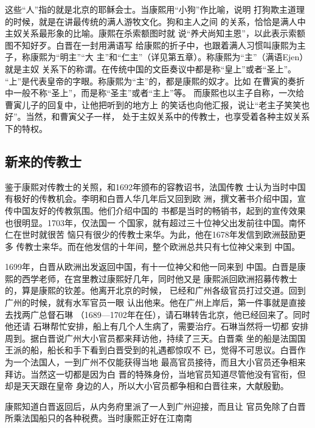 \par
这些“人”指的就是北京的耶稣会士。当康熙用“小狗”作比喻，说明%
打狗欺主道理的时候，就是在讲最传统的满人游牧文化。狗和主人之间%
的关系，恰恰是满人中主奴关系最形象的比喻。康熙在杀索额图时就%
说“养犬尚知主恩”，以此表示索额图不知好歹。白晋在一封用满语写%
给康熙的折子中，也跟着满人习惯叫康熙为主子，称康熙为“明主”“大%
主”和“仁主”（详见第五章）。称康熙为“主”（满语Ejen）就是主奴%
关系下的称谓。在传统中国的文臣奏议中都是称“皇上”或者“圣上”。%
“上”是代表皇帝的字眼。称康熙为“主”的，都是康熙的奴才。比如%
在曹寅的奏折中一般不称“圣上”，而是称“圣主”或者“主上”等。%
而康熙也以主子自称，一次给曹寅儿子的回复中，让他把听到的地方上%
的笑话也向他汇报，说让“老主子笑笑也好”。当然，和曹寅父子一样，%
处于主奴关系中的传教士，也享受着各种主奴关系下的特权。%
\subsection{新来的传教士}
\par
鉴于康熙对传教士的关照，和1692年颁布的容教诏书，法国传教%
士认为当时中国有极好的传教机会。李明和白晋人华几年后又回到欧%
洲，撰文著书介绍中国，宣传中国友好的传教氛围。他们介绍中国的%
书都是当时的畅销书，起到的宣传效果也很明显。1703年，仅法国一%
个国家，就有超过三十位神父出发前往中国。南怀仁在世时就很苦%
恼只有很少的传教士来华。为此，他在1678年发信到欧洲鼓励更多%
传教士来华。而在他发信的十年间，整个欧洲总共只有七位神父来到%
中国。%
\par
1699年，白晋从欧洲出发返回中国，有十一位神父和他一同来到%
中国。白晋是康熙的西学老师，在宫里教过康熙好几年，同时他又是%
康熙派回欧洲招募传教士的，算是康熙的钦差。他离开北京的时候，%
已经和广州各级官员打过交道。回到广州的时候，就有水军官员一眼%
认出他来。他在广州上岸后，第一件事就是直接去找两广总督石琳%
（1689—1702年在任），请石琳转告北京，他已经回来了。同时他还请%
石琳帮忙安排，船上有几个人生病了，需要治疗。石琳当然将一切都%
安排周到。据白晋说广州大小官员都来拜访他，持续了三天。白晋乘%
坐的船是法国国王派的船，船长和手下看到白晋受到的礼遇都惊叹不%
已，觉得不可思议。白晋作为一个法国人，一到广州不仅能获得当地%
最高官员接待，而且大小官员还争相来拜访。当然这一切都是因为白%
晋的特殊身份，当地官员知道尽管他没有官衔，但却是天天跟在皇帝%
身边的人，所以大小官员都争相和白晋往来，大献殷勤。%
\par
康熙知道白晋返回后，从内务府里派了一人到广州迎接，而且让%
官员免除了白晋所乘法国船只的各种税费。当时康熙正好在江南南%
